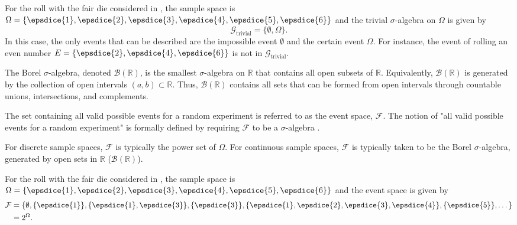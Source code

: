 \begin{example}
	\label{ex:die1a}
	For the roll with the fair die considered in , the sample space is $\Omega = \{ \epsdice{1}, \epsdice{2}, \epsdice{3}, \epsdice{4}, \epsdice{5}, \epsdice{6} \}$ and the trivial $\sigma$-algebra on $\Omega$ is given by
	\begin{equation}
		\mathcal{G}_{\text{trivial}} = \{\emptyset, \Omega\}.
	\end{equation}
	In this case, the only events that can be described are the impossible event $\emptyset$ and the certain event $\Omega$. For instance, the event of rolling an even number $E = \{\epsdice{2}, \epsdice{4}, \epsdice{6}\}$ is not in $\mathcal{G}_{\text{trivial}}$.
\end{example}

\begin{definition}
	\label{def:borel_sigma_algebra}
	The Borel $\sigma$-algebra, denoted $\mathcal{B}(\mathbb{R})$, is the smallest $\sigma$-algebra on $\mathbb{R}$ that contains all open subsets of $\mathbb{R}$.  Equivalently, $\mathcal{B}(\mathbb{R})$ is generated by the collection of open intervals $(a,b) \subset \mathbb{R}$. Thus, $\mathcal{B}(\mathbb{R})$ contains all sets that can be formed from open intervals through countable unions, intersections, and complements.  
\end{definition}

\begin{definition}
	\label{def:event_space}
	The set containing all valid possible events for a random experiment is referred to as the event space, $\mathcal{F}$. The notion of "all valid possible events for a random experiment" is formally defined by requiring $\mathcal{F}$ to be a $\sigma$-algebra .
\end{definition}

\begin{remark}
	For discrete sample spaces, $\mathcal{F}$ is typically the power set of $\Omega$. For continuous sample spaces, $\mathcal{F}$ is typically taken to be the Borel $\sigma$-algebra, generated by open sets in $\mathbb{R}$ ($\mathcal{B}(\mathbb{R})$).
\end{remark}

\begin{example}
	\label{ex:die2}
	For the roll with the fair die considered in , the sample space is $\Omega = \{ \epsdice{1}, \epsdice{2}, \epsdice{3}, \epsdice{4}, \epsdice{5}, \epsdice{6} \}$ and the event space is given by
	\begin{equation}
		\begin{split}
			\mathcal{F}&=\{\emptyset, \{\epsdice{1}\},\{\epsdice{1},\epsdice{3}\},\{\epsdice{3}\},\{\epsdice{1},\epsdice{2},\epsdice{3},\epsdice{4}\},\{\epsdice{5}\},\dots\}\\
			& = 2^\Omega.
		\end{split}
	\end{equation}
\end{example}

